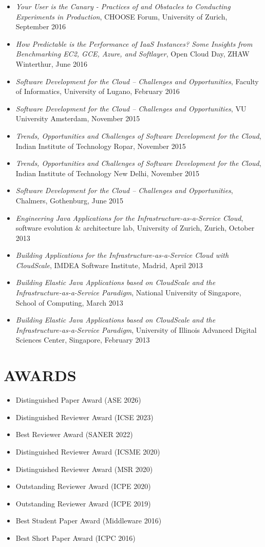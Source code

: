 \documentclass[paper=letter,fontsize=11pt]{scrartcl} %
\newcommand{\NewPart}[2]{\section*{\uppercase{#1} #2}}
\begin{document}
\begin{itemize}
\item \emph{Your User is the Canary - Practices of and Obstacles to Conducting Experiments in Production}, CHOOSE Forum, University of Zurich, September 2016
\item \emph{How Predictable is the Performance of IaaS Instances? Some Insights from Benchmarking EC2, GCE, Azure, and Softlayer}, Open Cloud Day, ZHAW Winterthur, June 2016
\item \emph{Software Development for the Cloud – Challenges and Opportunities}, Faculty of Informatics, University of Lugano, February 2016
\item \emph{Software Development for the Cloud – Challenges and Opportunities}, VU University Amsterdam, November 2015
\item \emph{Trends, Opportunities and Challenges of Software Development for the Cloud}, Indian Institute of Technology Ropar, November 2015
\item \emph{Trends, Opportunities and Challenges of Software Development for the Cloud}, Indian Institute of Technology New Delhi, November 2015
\item \emph{Software Development for the Cloud -- Challenges and Opportunities}, Chalmers, Gothenburg, June 2015
\item \emph{Engineering Java Applications for the Infrastructure-as-a-Service Cloud}, software evolution \& architecture lab, University of Zurich, Zurich, October 2013
\item \emph{Building Applications for the Infrastructure-as-a-Service Cloud with CloudScale}, IMDEA Software Institute, Madrid, April 2013
\item \emph{Building Elastic Java Applications based on CloudScale and the Infrastructure-as-a-Service Paradigm}, National University of Singapore, School of Computing, March 2013
\item \emph{Building Elastic Java Applications based on CloudScale and the Infrastructure-as-a-Service Paradigm}, University of Illinois Advanced Digital Sciences Center, Singapore, February 2013
\end{itemize}

\NewPart{Awards}{}
\begin{itemize}
\item Distinguished Paper Award (ASE 2026)
\item Distinguished Reviewer Award (ICSE 2023)  
\item Best Reviewer Award (SANER 2022)  
\item Distinguished Reviewer Award (ICSME 2020)  
\item Distinguished Reviewer Award (MSR 2020)
\item Outstanding Reviewer Award (ICPE 2020)
\item Outstanding Reviewer Award (ICPE 2019)
\item Best Student Paper Award (Middleware 2016)
\item Best Short Paper Award (ICPC 2016)
\end{itemize}
\end{document}
